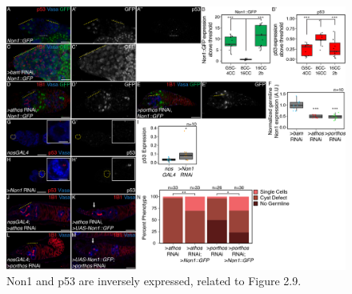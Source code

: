 \documentclass[12pt,oneside]{reedthesis}
\begin{document}
\begin{figure}

{\centering \includegraphics[width=7 in,height=5.409091 in]{./figure/Ribosome Biogenesis/Ribosome Biogenesis 5S} 

}

\caption[Non1 and p53 are inversely expressed, related to Figure 2.9.]{Non1 and p53 are inversely expressed, related to Figure 2.9.}\label{fig:unnamed-chunk-15}
\end{figure}
\textbf{\hfill\break
}
\end{document}
